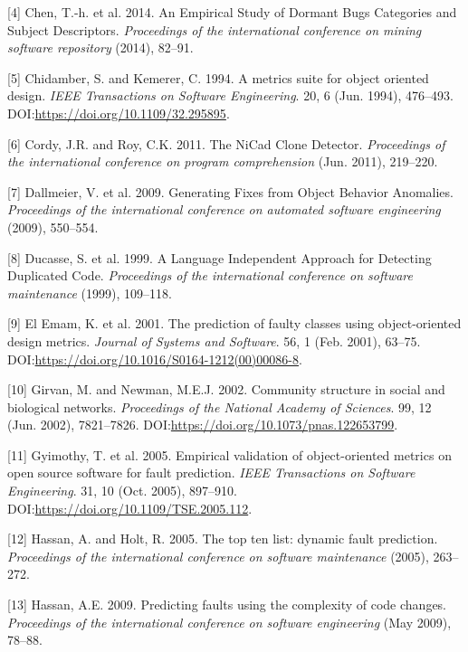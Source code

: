 \documentclass[sigconf]{acmart}
\begin{document}
\hypertarget{ref-Chen2014}{}
{[}4{]} Chen, T.-h. et al. 2014. An Empirical Study of Dormant Bugs
Categories and Subject Descriptors. \emph{Proceedings of the
international conference on mining software repository} (2014), 82--91.

\hypertarget{ref-Chidamber1994}{}
{[}5{]} Chidamber, S. and Kemerer, C. 1994. A metrics suite for object
oriented design. \emph{IEEE Transactions on Software Engineering}. 20, 6
(Jun. 1994), 476--493. DOI:\url{https://doi.org/10.1109/32.295895}.

\hypertarget{ref-Cordy2011}{}
{[}6{]} Cordy, J.R. and Roy, C.K. 2011. The NiCad Clone Detector.
\emph{Proceedings of the international conference on program
comprehension} (Jun. 2011), 219--220.

\hypertarget{ref-Dallmeier}{}
{[}7{]} Dallmeier, V. et al. 2009. Generating Fixes from Object Behavior
Anomalies. \emph{Proceedings of the international conference on
automated software engineering} (2009), 550--554.

\hypertarget{ref-StephaneDucasse}{}
{[}8{]} Ducasse, S. et al. 1999. A Language Independent Approach for
Detecting Duplicated Code. \emph{Proceedings of the international
conference on software maintenance} (1999), 109--118.

\hypertarget{ref-ElEmam2001}{}
{[}9{]} El Emam, K. et al. 2001. The prediction of faulty classes using
object-oriented design metrics. \emph{Journal of Systems and Software}.
56, 1 (Feb. 2001), 63--75.
DOI:\url{https://doi.org/10.1016/S0164-1212(00)00086-8}.

\hypertarget{ref-Girvan2002}{}
{[}10{]} Girvan, M. and Newman, M.E.J. 2002. Community structure in
social and biological networks. \emph{Proceedings of the National
Academy of Sciences}. 99, 12 (Jun. 2002), 7821--7826.
DOI:\url{https://doi.org/10.1073/pnas.122653799}.

\hypertarget{ref-Gyimothy2005}{}
{[}11{]} Gyimothy, T. et al. 2005. Empirical validation of
object-oriented metrics on open source software for fault prediction.
\emph{IEEE Transactions on Software Engineering}. 31, 10 (Oct. 2005),
897--910. DOI:\url{https://doi.org/10.1109/TSE.2005.112}.

\hypertarget{ref-Hassan2005}{}
{[}12{]} Hassan, A. and Holt, R. 2005. The top ten list: dynamic fault
prediction. \emph{Proceedings of the international conference on
software maintenance} (2005), 263--272.

\hypertarget{ref-Hassan2009}{}
{[}13{]} Hassan, A.E. 2009. Predicting faults using the complexity of
code changes. \emph{Proceedings of the international conference on
software engineering} (May 2009), 78--88.
\end{document}
